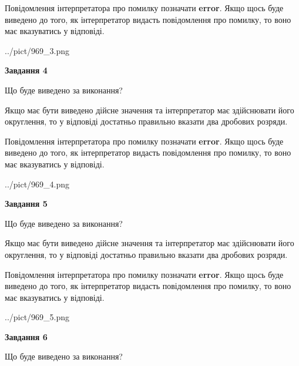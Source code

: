 \documentclass[12pt, ukrainian]{article}
\begin{document}
{\begin {Large}
Повідомлення інтерпретатора про помилку позначати \textbf{error}.
Якщо щось буде виведено до того, як інтерпретатор видасть повідомлення про помилку, 
то воно має вказуватись у відповіді. \par

\begin{center}
	{../pict/969_3.png}
\end{center}
\newpage

{\begin {center}\textbf{Завдання 4}\end {center}}\par
Що буде виведено за виконання? \par

Якщо має бути виведено дійсне значення та інтерпретатор має здійснювати його округлення, 
то у відповіді достатньо правильно вказати два дробових розряди.

Повідомлення інтерпретатора про помилку позначати \textbf{error}.
Якщо щось буде виведено до того, як інтерпретатор видасть повідомлення про помилку, 
то воно має вказуватись у відповіді. \par

\begin{center}
	{../pict/969_4.png}
\end{center}
\newpage

{\begin {center}\textbf{Завдання 5}\end {center}}\par
Що буде виведено за виконання? \par

Якщо має бути виведено дійсне значення та інтерпретатор має здійснювати його округлення, 
то у відповіді достатньо правильно вказати два дробових розряди.

Повідомлення інтерпретатора про помилку позначати \textbf{error}.
Якщо щось буде виведено до того, як інтерпретатор видасть повідомлення про помилку, 
то воно має вказуватись у відповіді. \par

\begin{center}
	{../pict/969_5.png}
\end{center}
\newpage

{\begin {center}\textbf{Завдання 6}\end {center}}\par
Що буде виведено за виконання? \par


\end{Large}}
\end{document}
